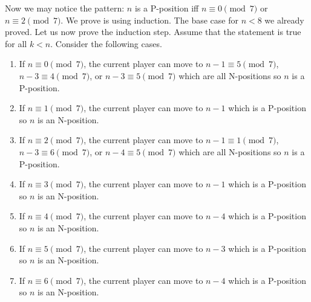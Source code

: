Now we may notice the pattern: $n$ is a P-position iff $n \equiv 0 \pmod{7}$
or $n \equiv 2 \pmod{7}$. We prove is using induction. The base case for $n < 8$
we already proved. Let us now prove the induction step. Assume that the
statement is true for all $k < n$. Consider the following cases.
\begin{enumerate}
  \item If $n \equiv 0 \pmod{7}$, the current player can move to
    $n - 1 \equiv 5 \pmod {7}$, $n - 3 \equiv 4 \pmod {7}$, or
    $n - 3 \equiv 5 \pmod {7}$ which are all N-positions so $n$ is a P-position.
  \item If $n \equiv 1 \pmod{7}$, the current player can move to $n - 1$ which
    is a P-position so $n$ is an N-position.
  \item If $n \equiv 2 \pmod{7}$, the current player can move to
    $n - 1 \equiv 1 \pmod {7}$, $n - 3 \equiv 6 \pmod {7}$, or
    $n - 4 \equiv 5 \pmod {7}$ which are all N-positions so $n$ is a P-position.
  \item If $n \equiv 3 \pmod{7}$, the current player can move to $n - 1$ which
    is a P-position so $n$ is an N-position.
  \item If $n \equiv 4 \pmod{7}$, the current player can move to $n - 4$ which
    is a P-position so $n$ is an N-position.
  \item If $n \equiv 5 \pmod{7}$, the current player can move to $n - 3$ which
    is a P-position so $n$ is an N-position.
  \item If $n \equiv 6 \pmod{7}$, the current player can move to $n - 4$ which
    is a P-position so $n$ is an N-position.
\end{enumerate}


